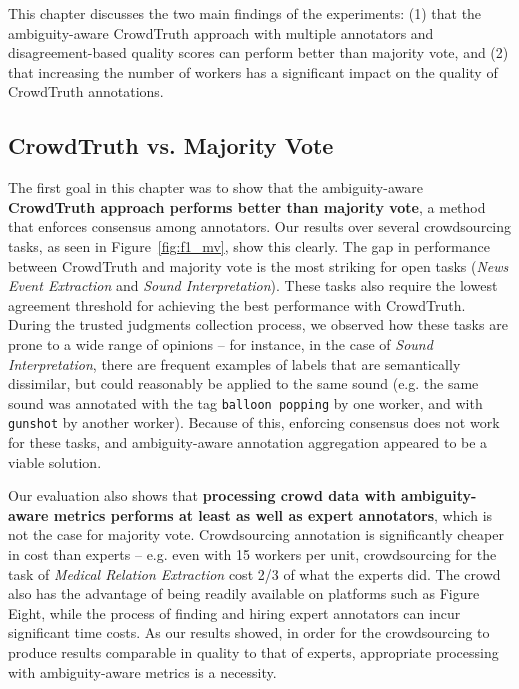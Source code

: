 {\color{blue}
This chapter discusses the two main findings of the experiments: (1) that the ambiguity-aware CrowdTruth approach with multiple annotators and disagreement-based quality scores can perform better than majority vote, and (2) that increasing the number of workers has a significant impact on the quality of CrowdTruth annotations.

\subsection{CrowdTruth vs. Majority Vote}


The first goal in this chapter was to show that the ambiguity-aware \textbf{CrowdTruth approach performs better than majority vote}, a method that enforces consensus among annotators.  Our results over several crowdsourcing tasks, as seen in Figure~\ref{fig:f1_mv}, show this clearly. The gap in performance between CrowdTruth and majority vote is the most striking for open tasks (\textit{News Event Extraction} and \textit{Sound Interpretation}).  These tasks also require the lowest agreement threshold for achieving the best performance with CrowdTruth.  During the trusted judgments collection process, we observed how these tasks are prone to a wide range of opinions -- for instance, in the case of \textit{Sound Interpretation}, there are frequent examples of labels that are semantically dissimilar, but could reasonably be applied to the same sound (e.g. the same sound was annotated with the tag \texttt{balloon popping} by one worker, and with \texttt{gunshot} by another worker).  Because of this, enforcing consensus does not work for these tasks, and ambiguity-aware annotation aggregation appeared to be a viable solution.

Our evaluation also shows that \textbf{processing crowd data with ambiguity-aware metrics performs at least as well as expert annotators}, which is not the case for majority vote.  Crowdsourcing annotation is significantly cheaper in cost than experts --  e.g. even with 15 workers per unit, crowdsourcing for the task of \textit{Medical Relation Extraction} cost 2/3 of what the experts did. The crowd also has the advantage of being readily available on platforms such as Figure Eight, while the process of finding and hiring expert annotators can incur significant time costs. As our results showed, in order for the crowdsourcing to produce results comparable in quality to that of experts, appropriate processing with ambiguity-aware metrics is a necessity.

}
